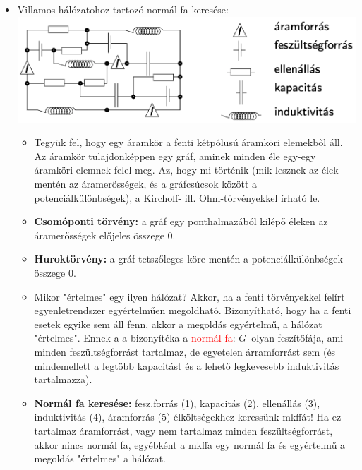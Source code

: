 \documentclass[../../szobeli.tex]{subfiles}
\begin{document}
\begin{itemize}
        \item Villamos hálózatohoz tartozó normál fa keresése: \\ \includegraphics[scale=0.45]{./img/1.png} \begin{itemize}
            \item Tegyük fel, hogy egy áramkör a fenti kétpólusú áramköri elemekből áll. Az áramkör tulajdonképpen egy gráf, aminek minden éle egy-egy áramköri elemnek felel meg. Az, hogy mi történik (mik lesznek az élek mentén az áramerősségek, és a gráfcsúcsok között a potenciálkülönbségek), a Kirchoff- ill. Ohm-törvényekkel írható le.
            \item \textbf{Csomóponti törvény:} a gráf egy ponthalmazából kilépő éleken az áramerősségek előjeles összege 0.
            \item \textbf{Huroktörvény:} a gráf tetszőleges köre mentén a potenciálkülönbségek összege 0.
            \item Mikor "értelmes" egy ilyen hálózat? Akkor, ha a fenti törvényekkel felírt egyenletrendszer egyértelműen megoldható. Bizonyítható, hogy ha a fenti esetek egyike sem áll fenn, akkor a megoldás egyértelmű, a hálózat "értelmes". Ennek a a bizonyítéka a \textcolor{red}{normál fa}: $G$ olyan feszítőfája, ami minden feszültségforrást tartalmaz, de egyetelen árramforrást sem (és mindemellett a legtöbb kapacitást és a lehető legkevesebb induktivitás tartalmazza).
            \item \textbf{Normál fa keresése:} fesz.forrás (1), kapacitás (2), ellenállás (3), induktivitás (4), áramforrás (5) élköltségekhez keressünk mkffát! Ha ez tartalmaz áramforrást, vagy nem tartalmaz minden feszültségforrást, akkor nincs normál fa, egyébként a mkffa egy normál fa és egyértelmű a megoldás "értelmes" a hálózat.
        \end{itemize}
    \end{itemize}
    
\end{document}

